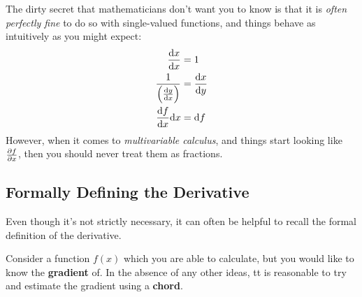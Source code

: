 \documentclass[a4paper,openany,11pt]{book}
\begin{document}
				The dirty secret that mathematicians don't want you to know is that it is \textit{often perfectly fine} to do so with single-valued functions, and things behave as intuitively as you might expect:
				\begin{align}
					\frac{\mathrm d x}{\mathrm d x} & = 1
					\\
					\frac{1}{\left(\frac{\mathrm d y}{\mathrm d x} \right)} & = \frac{\mathrm d x}{\mathrm d y}
					\\
					\frac{\mathrm d f}{\mathrm d x}\mathrm d x & = \mathrm d f
				\end{align}
				However, when it comes to \textit{multivariable calculus}, and things start looking like $\frac{\partial f}{\partial x}$, then you should never treat them as fractions.

				\subsection{Formally Defining the Derivative}

					Even though it's not strictly necessary, it can often be helpful to recall the formal definition of the derivative. 

					Consider a function $f(x)$ which you are able to calculate, but you would like to know the \textbf{gradient} of. In the absence of any other ideas, tt is reasonable to try and estimate the gradient using a \textbf{chord}. 
					
\end{document}
